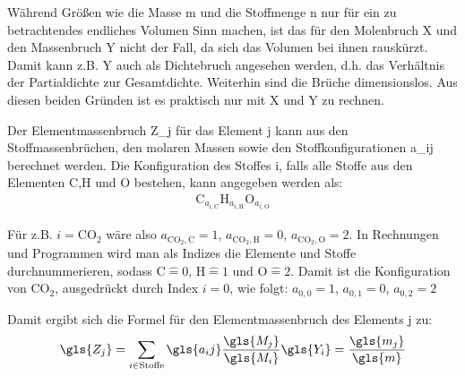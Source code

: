 Während Größen wie die Masse \gls{m} und die Stoffmenge \gls{n} nur für ein zu betrachtendes endliches Volumen Sinn machen, ist das für den Molenbruch \gls{X} und den Massenbruch \gls{Y} nicht der Fall, da sich das Volumen bei ihnen rauskürzt. Damit kann z.B. \gls{Y} auch als Dichtebruch angesehen werden, d.h. das Verhältnis der Partialdichte zur Gesamtdichte. Weiterhin sind die Brüche dimensionslos. Aus diesen beiden Gründen ist es praktisch nur mit \gls{X} und \gls{Y} zu rechnen.

Der Elementmassenbruch \gls{Z_j} für das Element \gls{j} kann aus den Stoffmassenbrüchen, den molaren Massen sowie den Stoffkonfigurationen \gls{a_ij} berechnet werden. Die Konfiguration des Stoffes \gls{i}, falls alle Stoffe aus den Elementen C,H und O bestehen, kann angegeben werden als:
\begin{align}
    \label{eq:defaij}
    \mathrm{C}_{a_{i,\mathrm{C}}} \mathrm{H}_{a_{i,\mathrm{H}}} \mathrm{O}_{a_{i,\mathrm{O}}}
\end{align}

Für z.B. $i=\mathrm{CO}_2$ wäre also $a_{\mathrm{CO}_2,\mathrm{C}}=1$, $a_{\mathrm{CO}_2,\mathrm{H}}=0$, $a_{\mathrm{CO}_2,\mathrm{O}}=2$. In Rechnungen und Programmen wird man als Indizes die Elemente und Stoffe durchnummerieren, sodass $\mathrm{C}\hat{=}0$, $\mathrm{H}\hat{=}1$ und $\mathrm{O}\hat{=}2$. Damit ist die Konfiguration von $\mathrm{CO}_2$, ausgedrückt durch Index $i=0$, wie folgt: $a_{0,0}=1$, $a_{0,1}=0$, $a_{0,2}=2$

Damit ergibt sich die Formel für den Elementmassenbruch des Elements \gls{j} zu:
\begin{align}
    \label{eq:zfromy}
    \gls{Z_j}
    = \sum\limits_{i \in \text{Stoffe}} \gls{a_ij} \frac{\gls{M_j}}{\gls{M_i}} \gls{Y_i}
    = \frac{\gls{m_j}}{\gls{m}}
\end{align}


